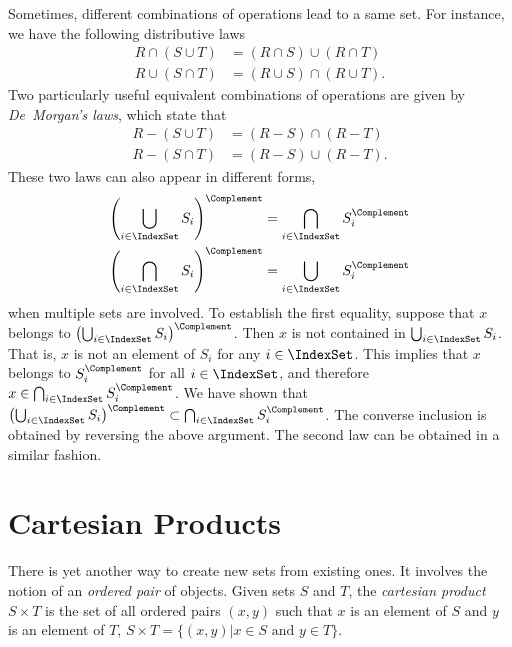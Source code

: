 Sometimes, different combinations of operations lead to a same set.
For instance, we have the following distributive laws
\begin{align*}
R \cap (S \cup T) &= (R \cap S) \cup (R \cap T) \\
R \cup (S \cap T) &= (R \cup S) \cap (R \cup T).
\end{align*}
Two particularly useful equivalent combinations of operations are given by \emph{De~Morgan's laws}, which state that
\begin{align*}
R - (S \cup T) &= (R - S) \cap (R - T) \\
R - (S \cap T) &= (R - S) \cup (R - T).
\end{align*}
These two laws can also appear in different forms,
\begin{align*}
\left( \bigcup_{i \in \IndexSet} S_{i} \right)^{\Complement}
&= \bigcap_{i \in \IndexSet} S_{i}^{\Complement} \\
\left( \bigcap_{i \in \IndexSet} S_{i} \right)^{\Complement}
&= \bigcup_{i \in \IndexSet} S_{i}^{\Complement}
\end{align*}
when multiple sets are involved.
To establish the first equality, suppose that $x$ belongs to $\left( \bigcup_{i \in \IndexSet} S_{i} \right)^{\Complement}$.
Then $x$ is not contained in $\bigcup_{i \in \IndexSet} S_{i}$.
That is, $x$ is not an element of $S_{i}$ for any $i \in \IndexSet$.
This implies that $x$ belongs to $S_{i}^{\Complement}$ for all $i \in \IndexSet$, and therefore $x \in \bigcap_{i \in \IndexSet} S_{i}^{\Complement}$.
We have shown that $\left( \bigcup_{i \in \IndexSet} S_{i} \right)^{\Complement} \subset \bigcap_{i \in \IndexSet} S_{i}^{\Complement}$.
The converse inclusion is obtained by reversing the above argument.
The second law can be obtained in a similar fashion.


\section{Cartesian Products}

There is yet another way to create new sets from existing ones.
It involves the notion of an \emph{ordered pair} of objects.
Given sets $S$ and $T$, the \emph{cartesian product} $S \times T$ is the set of all ordered pairs $(x, y)$ such that $x$ is an element of $S$ and $y$ is an element of $T$, $S \times T = \{ (x, y) | x \in S \text{ and } y \in T \}$.

